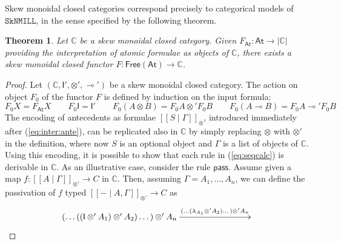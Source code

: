 \documentclass[copyright,creativecommons]{eptcs}
\newtheorem{theorem}{Theorem}[section]
\theoremstyle{definition}
\newcommand{\ldbc}{[\![}
\newcommand{\rdbc}{]\!]}
\newcommand{\pass}{\mathsf{pass}}
\newcommand{\ot}{\otimes}
\newcommand{\lolli}{\multimap}
\newcommand{\I}{\mathsf{I}}
\newcommand{\SkNMILL}{$\mathtt{SkNMILL}$}
\newcommand{\FSkMCC}{\mathsf{Free}}
\begin{document}
Skew monoidal closed categories correspond precisely to categorical models of \SkNMILL, in the sense specified by the following theorem.
\begin{theorem}\label{thm:models}
  Let $\mathbb{C}$ be a skew monoidal closed category. Given $F_{\mathsf{At}} : \mathsf{At} \rightarrow |\mathbb{C}|$ providing the interpretation of atomic formulae as objects of $\mathbb{C}$, there exists a skew monoidal closed functor $F : \FSkMCC(\mathsf{At}) \rightarrow \mathbb{C}$.
\end{theorem}
\begin{proof}
  Let $(\mathbb{C} , \I' , \ot' , \lolli')$ be a skew monoidal closed category.
  The action on object $F_0$ of the functor $F$ is defined by induction on the input formula:
  \begin{equation*}
    F_0X = F_{\mathsf{At}}X
    \qquad
    F_0\I = \I'
    \qquad
    F_0(A \ot B) = F_0A \ot' F_0B
    \qquad
    F_0(A \lolli B) = F_0A \lolli' F_0B
  \end{equation*}
  The encoding of antecedents as formulae $\ldbc S \mid \Gamma \rdbc_{\ot}$, introduced immediately after (\ref{eq:inter:ante}), can be replicated also in $\mathbb{C}$ by simply replacing $\ot$ with $\ot'$ in the definition, where now $S$ is an optional object and $\Gamma$ is a list of objects of $\mathbb{C}$. Using this encoding, it is possible to show that each rule in (\ref{eq:seqcalc}) is derivable in $\mathbb{C}$. As an illustrative case, consider the rule $\pass$. Assume given a map $f : \ldbc A \mid \Gamma \rdbc_{\ot'} \to C$ in $\mathbb{C}$. Then, assuming $\Gamma = A_1,\dots,A_n$, we can define the passivation of $f$ typed $\ldbc {-} \mid A, \Gamma \rdbc_{\ot'} \to C$ as
\[\xymatrixcolsep{7pc}
\xymatrix{
  (\dots ((\I \ot' A_1) \ot' A_2) \dots ) \ot' A_n
  \ar[r]^-{(\dots (\lambda_{A_1} \ot' A_2) \dots ) \ot' A_n} &
}\]
\end{proof}
\end{document}
